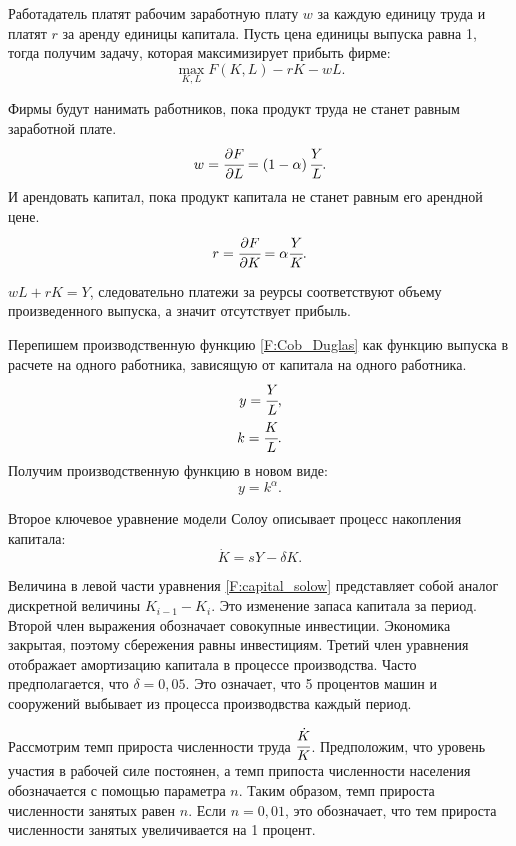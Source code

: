 Работадатель платят рабочим заработную плату $w$ за каждую единицу труда и платят $r$ за аренду единицы капитала.
Пусть цена единицы выпуска равна 1, тогда получим задачу, которая максимизирует прибыть фирме:
\begin{equation}
	\max\limits_{K, L} F(K,L) - rK - wL\text{.}
\end{equation}

Фирмы будут нанимать работников, пока продукт труда не станет равным заработной плате.
\begin{equation*}
	w = \cfrac{\partial F}{\partial L} = \left(1-\alpha\right)\cfrac{Y}{L}\text{.}
\end{equation*}
И арендовать капитал, пока продукт капитала не станет равным его арендной цене.
\begin{equation*}
	r = \cfrac{\partial F}{\partial K} = \alpha\cfrac{Y}{K}\text{.}
\end{equation*}

$wL + rK = Y$, следовательно платежи за реурсы соответствуют объему произведенного выпуска, а значит отсутствует прибыль.

Перепишем производственную функцию \ref{F:Cob_Duglas} как функцию выпуска в расчете на одного работника, зависящую от капитала на одного работника.
\begin{align*}
y = \cfrac{Y}{L}\text{,}\\
k = \cfrac{K}{L}\text{.}
\end{align*}
Получим производственную функцию в новом виде:
\begin{equation}
	y = k^{\alpha}\text{.}
\end{equation}

Второе ключевое уравнение модели Солоу описывает процесс накопления капитала:
\begin{equation}
\dot{K} = sY-\delta K \text{.}
\label{F:capital_solow}
\end{equation}

Величина в левой части уравнения \ref{F:capital_solow} представляет собой аналог дискретной величины $K_{i-1} - K_{i}$.
Это изменение запаса капитала за период.
Второй член выражения обозначает совокупные инвестиции.
Экономика закрытая, поэтому сбережения равны инвестициям.
Третий член уравнения отображает амортизацию капитала в процессе производства.
Часто предполагается, что $\delta = 0,05$.
Это означает, что 5 процентов машин и сооружений выбывает из процесса производвства каждый период.

Рассмотрим темп прироста численности труда $\cfrac{\dot{K}}{K}$.
Предположим, что уровень участия в рабочей силе постоянен, а темп припоста численности населения обозначается с помощью параметра $n$.
Таким образом, темп прироста численности  занятых равен $n$.
Если $n = 0,01$, это обозначает, что тем прироста численности занятых увеличивается на 1 процент.


